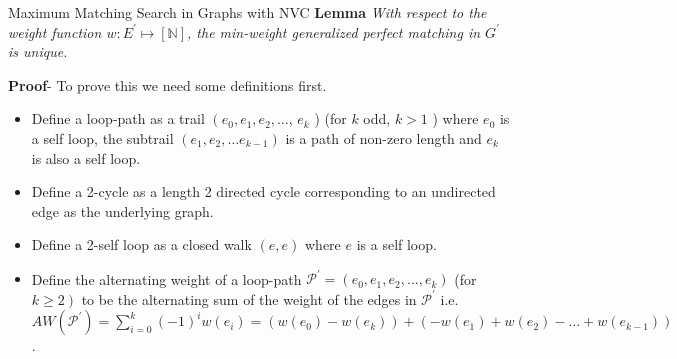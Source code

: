 \documentclass{beamer}
\begin{document}
\begin{frame}[allowframebreaks]{Maximum Matching Search in Graphs with NVC}
   \textbf{Lemma} \textit{With respect to the weight function $w: E^{\prime} \mapsto[\mathbb{N}]$, the min-weight generalized perfect matching in $G^{\prime}$ is unique.}
   
   \textbf{Proof}- To prove this we need some definitions first. \begin{itemize}
   	
   \item Define a loop-path as a trail $\left(e_0, e_1, e_2, \ldots\right.$, $e_k$ ) (for $k$ odd, $k>1$ ) where $e_0$ is a self loop, the subtrail $\left(e_1, e_2, \ldots e_{k-1}\right)$ is a path of non-zero length and $e_k$ is also a self loop.
   \item Define a 2-cycle as a length 2 directed cycle corresponding to an undirected edge as the underlying graph.\item Define a 2-self loop as a closed walk $(e, e)$ where $e$ is a self loop.\item  Define the alternating weight of a loop-path $\mathcal{P}^{\prime}=\left(e_0, e_1, e_2, \ldots, e_k\right)$ (for $\left.k \geq 2\right)$ to be the alternating sum of the weight of the edges in $\mathcal{P}^{\prime}$ i.e. $A W\left(\mathcal{P}^{\prime}\right)=\sum_{i=0}^k(-1)^i w\left(e_i\right)=\left(w\left(e_0\right)-w\left(e_k\right)\right)+\left(-w\left(e_1\right)+w\left(e_2\right)-\ldots+w\left(e_{k-1}\right)\right)$.
   

\end{itemize}
\end{frame}
\end{document}
